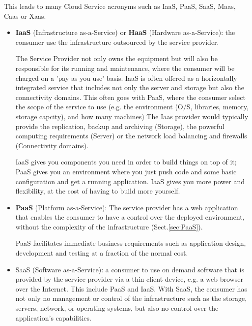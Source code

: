 This leads to many Cloud Service acronyms such as IaaS, PaaS,
SaaS, Maas, Caas or Xaas.
\begin{itemize}
  \item {\bf IaaS} (Infrastructure as-a-Service) or {\bf HaaS} (Hardware
  as-a-Service):   the consumer use the infrastructure outsourced by the service
  provider.
  
   The Service Provider not only owns the equipment but will also be responsible
  for its running and maintenance, where the consumer will be charged on a 'pay
  as you use' basis. IaaS is often offered as a horizontally integrated service
  that includes not only the server and storage but also the connectivity
  domains. This often goes with PaaS, where the consumer select the scope of the
  service to use (e.g. the environment (O/S, libraries, memory, storage
  capcity), and how many machines) The Iaas provider would typically provide the
  replication, backup and archiving (Storage), the powerful computing
  requirements (Server) or the network load balancing and firewalls
  (Connectivity domains).
  
\begin{mdframed}
IaaS gives you components you need in order to build things on top of it; PaaS
gives you an environment where you just push code and some basic configuration
and get a running application. IaaS gives you more power and flexibility, at the
cost of having to build more yourself.    
\end{mdframed}  
  
  \item  {\bf PaaS} (Platform as-a-Service): The service provider has a web
  application that enables the consumer to have a control over the deployed
  environment, without the complexity of the infrastructure
  (Sect.\ref{sec:PaaS}).
  
  PaaS facilitates immediate business requirements such as application design,
  development and testing at a fraction of the normal cost.
  
  \label{sec:SaaS}
  \item SaaS (Software as-a-Service): a consumer to use on demand software that
  is provided by the service provider via a thin client device, e.g. a web
  browser over the Internet. This include PaaS and IaaS. With SaaS, the consumer
  has not only no management or control of the infrastructure such as the
  storage, servers, network, or operating systems, but also no control over the
  application's capabilities.
  

\end{itemize}
